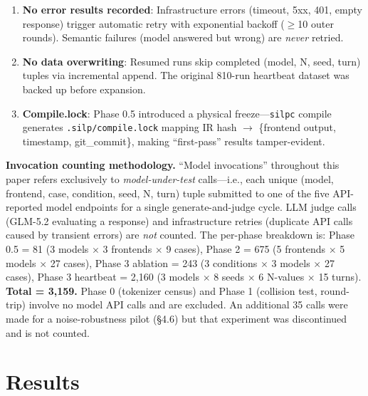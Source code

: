 \documentclass{article}
\begin{document}
\begin{enumerate}


\item

  \textbf{No error results recorded}: Infrastructure errors (timeout, 5xx, 401, empty response) trigger automatic retry with exponential backoff ($\geq$10 outer rounds). Semantic failures (model answered but wrong) are \emph{never} retried.

\item

  \textbf{No data overwriting}: Resumed runs skip completed (model, N, seed, turn) tuples via incremental append. The original 810-run heartbeat dataset was backed up before expansion.

\item

  \textbf{Compile.lock}: Phase 0.5 introduced a physical freeze---\texttt{silpc} compile generates \texttt{.silp/compile.lock} mapping IR hash $\to$ \{frontend output, timestamp, git\_commit\}, making ``first-pass'' results tamper-evident.

\end{enumerate}



\textbf{Invocation counting methodology.} ``Model invocations'' throughout this paper refers exclusively to \emph{model-under-test} calls---i.e., each unique (model, frontend, case, condition, seed, N, turn) tuple submitted to one of the five API-reported model endpoints for a single generate-and-judge cycle. LLM judge calls (GLM-5.2 evaluating a response) and infrastructure retries (duplicate API calls caused by transient errors) are \emph{not} counted. The per-phase breakdown is: Phase 0.5 = 81 (3 models $\times$ 3 frontends $\times$ 9 cases), Phase 2 = 675 (5 frontends $\times$ 5 models $\times$ 27 cases), Phase 3 ablation = 243 (3 conditions $\times$ 3 models $\times$ 27 cases), Phase 3 heartbeat = 2,160 (3 models $\times$ 8 seeds $\times$ 6 N-values $\times$ 15 turns). \textbf{Total = 3,159.} Phase 0 (tokenizer census) and Phase 1 (collision test, round-trip) involve no model API calls and are excluded. An additional 35 calls were made for a noise-robustness pilot (\S4.6) but that experiment was discontinued and is not counted.



\section{Results}\label{results}
\end{document}
